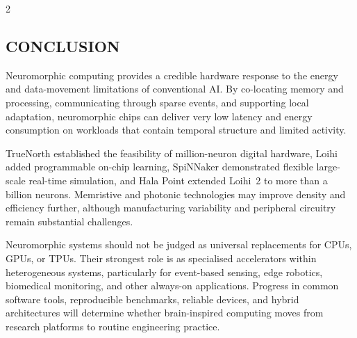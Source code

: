 \begin{multicols}{2}
  \subsection*{\centering\uppercase{Conclusion}}
  Neuromorphic computing provides a credible hardware response to the energy and data-movement limitations of conventional AI. By co-locating memory and processing, communicating through sparse events, and supporting local adaptation, neuromorphic chips can deliver very low latency and energy consumption on workloads that contain temporal structure and limited activity.

  \noindent
  TrueNorth established the feasibility of million-neuron digital hardware, Loihi added programmable on-chip learning, SpiNNaker demonstrated flexible large-scale real-time simulation, and Hala Point extended Loihi~2 to more than a billion neurons. Memristive and photonic technologies may improve density and efficiency further, although manufacturing variability and peripheral circuitry remain substantial challenges.

  \noindent
  Neuromorphic systems should not be judged as universal replacements for CPUs, GPUs, or TPUs. Their strongest role is as specialised accelerators within heterogeneous systems, particularly for event-based sensing, edge robotics, biomedical monitoring, and other always-on applications. Progress in common software tools, reproducible benchmarks, reliable devices, and hybrid architectures will determine whether brain-inspired computing moves from research platforms to routine engineering practice.


\end{multicols}
